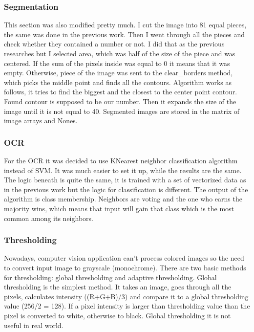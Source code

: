 \documentclass[../../main.tex]{subfiles}
\begin{document}
\subsubsection{Segmentation}

This section was also modified pretty much. I cut the image into 81 equal pieces, the same was done in the previous work. Then I went through all the pieces and check whether they contained a number or not. I did that as the previous researches but I selected area, which was half of the size of the piece and was centered. If the sum of the pixels inside was equal to 0 it means that it was empty. Otherwise, piece of the image was sent to the clear_borders method, which picks the middle point and finds all the contours. Algorithm works as follows, it tries to find the biggest and the closest to the center point contour. Found contour is supposed to be our number. Then it expands the size of the image until it is not equal to 40. Segmented images are stored in the matrix of image arrays and Nones.

\subsubsection{OCR}

For the OCR it was decided to use KNearest neighbor classification algorithm instead of SVM. It was much easier to set it up, while the results are the same. The logic beneath is quite the same, it is trained with a set of vectorized data as in the previous work but the logic for classification is different. The output of the algorithm is class membership. Neighbors are voting and the one who earns the majority wins, which means that input will gain that class which is the most common among its neighbors.



\subsubsection{Thresholding}

Nowadays, computer vision application can’t process colored images so the need to convert input image to grayscale (monochrome). There are two basic methods for thresholding: global thresholding and adaptive thresholding. Global thresholding is the simplest method. It takes an image, goes through all the pixels, calculates intensity ((R+G+B)/3) and compare it to a global thresholding value (256/2 = 128). If a pixel intensity is larger than thresholding value than the pixel is converted to white, otherwise to black. Global thresholding it is not useful in real world.
\end{document}
